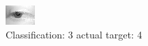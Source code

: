 \begin{figure}[h!]
\begin{center}
\includegraphics[width=0.60\columnwidth]{figures/ID2704_class_3_target_4.png}
\end{center}
\caption{ Classification: 3 actual target: 4}
\label{fig:ID2704_class_3_target_4}
\end{figure}
